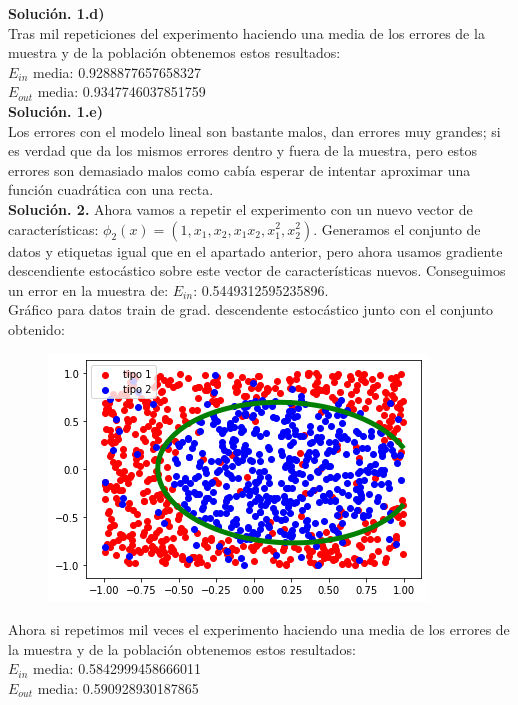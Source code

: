 \documentclass[a4paper,11pt]{article}
\begin{document}
\textbf{Solución. 1.d)} \\
Tras mil repeticiones del experimento haciendo una media de los errores de la muestra y de la población obtenemos estos resultados:\\

$E_{in}$ media:  0.9288877657658327\\
$E_{out}$ media:  0.9347746037851759\\

\textbf{Solución. 1.e)} \\
Los errores con el modelo lineal son bastante malos, dan errores muy grandes; si es verdad que da los mismos errores dentro y fuera de la muestra, pero estos errores son demasiado malos como cabía esperar de intentar aproximar una función cuadrática con una recta.\\

\textbf{Solución. 2.}
Ahora vamos a repetir el experimento con un nuevo vector de características: $\phi_2(x) = (1, x_1, x_2, x_1x_2, x_1^{2}, x_2^{2})$. Generamos el conjunto de datos y etiquetas igual que en el apartado anterior, pero ahora usamos gradiente descendiente estocástico sobre este vector de características nuevos. Conseguimos un error en la muestra de: $E_{in}$: 0.5449312595235896.\\

Gráfico para datos train de grad. descendente estocástico junto con el conjunto obtenido:

\begin{figure}[h]
\includegraphics[scale=0.5]{grafica1ej2.22}
\centering
\end{figure}

Ahora si repetimos mil veces el experimento haciendo una media de los errores de la muestra y de la población obtenemos estos resultados:\\

$E_{in}$ media:   0.5842999458666011\\
$E_{out}$ media:  0.590928930187865\\
\end{document}
